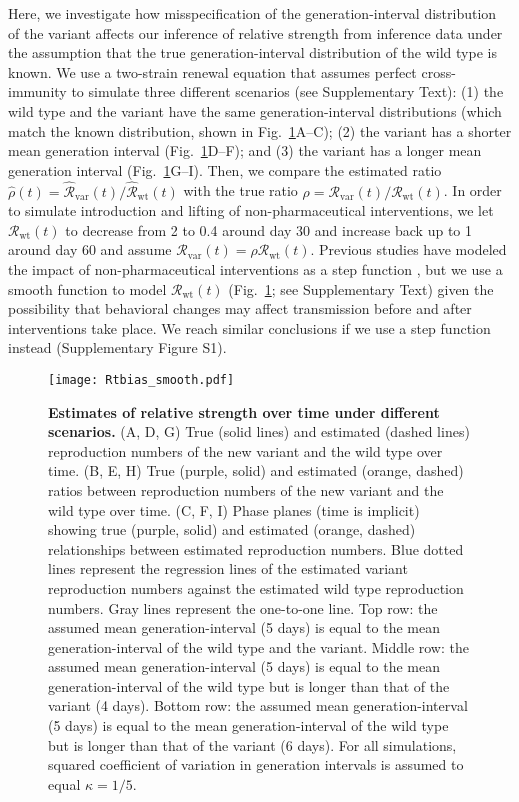 \documentclass[12pt]{article}
\newcommand{\fref}[1]{Fig.~\ref{fig:#1}}
\newcommand{\vvvar}{\mathrm{var}}
\newcommand{\wwwt}{\mathrm{wt}}
\newcommand{\Rx}[1]{\ensuremath{{\mathcal R}_{#1}}\xspace}
\newcommand{\RR}{\ensuremath{{\mathcal R}}\xspace}
\newcommand{\Rw}{\Rx{\wwwt}}
\newcommand{\Rv}{\Rx{\vvvar}}
\begin{document}
Here, we investigate how misspecification of the generation-interval distribution of the variant affects our inference of relative strength from inference data under the assumption that the true generation-interval distribution of the wild type is known.
We use a two-strain renewal equation that assumes perfect cross-immunity to simulate three different scenarios (see Supplementary Text):  
(1) the wild type and the variant have the same generation-interval distributions (which match the known distribution, shown in \fref{Rtbias}A--C);
(2) the variant has a shorter mean generation interval (\fref{Rtbias}D--F); and
(3) the variant has a longer mean generation interval (\fref{Rtbias}G--I).
Then, we compare the estimated ratio $\hat{\rho}(t) = \hat{\RR}_{\textrm{var}}(t)/\hat{\RR}_{\textrm{wt}}(t)$ with the true ratio $\rho = \Rv(t)/\Rw(t)$.
In order to simulate introduction and lifting of non-pharmaceutical interventions, we let $\Rw(t)$ to decrease from 2 to 0.4 around day 30 and increase back up to 1 around day 60 and assume $\Rv(t) = \rho \Rw(t)$.
Previous studies have modeled the impact of non-pharmaceutical interventions as a step function \citep{flaxman2020Rt}, but we use a smooth function to model $\Rw(t)$ (\fref{Rtbias}; see Supplementary Text) given the possibility that behavioral changes may affect transmission before and after interventions take place.
We reach similar conclusions if we use a step function instead (Supplementary Figure S1).

\begin{figure}[!pht]
\begin{center}
\texttt{[image: Rtbias\_smooth.pdf]}
\caption{
\textbf{Estimates of relative strength over time under different scenarios.}
(A, D, G) True (solid lines) and estimated (dashed lines) reproduction numbers of the new variant and the wild type over time.
(B, E, H) True (purple, solid) and estimated (orange, dashed) ratios between reproduction numbers of the new variant and the wild type over time.
(C, F, I) Phase planes (time is implicit) showing true (purple, solid) and estimated (orange, dashed) relationships between estimated reproduction numbers.
Blue dotted lines represent the regression lines of the estimated variant reproduction numbers against the estimated wild type reproduction numbers.
Gray lines represent the one-to-one line.
Top row: the assumed mean generation-interval (5 days) is equal to the mean generation-interval of the wild type and the variant.
Middle row: the assumed mean generation-interval (5 days) is equal to the mean generation-interval of the wild type but is longer than that of the variant (4 days).
Bottom row: the assumed mean generation-interval (5 days) is equal to the mean generation-interval of the wild type but is longer than that of the variant (6 days).
For all simulations, squared coefficient of variation in generation intervals is assumed to equal $\kappa = 1/5$.
}
\end{center}
\label{fig:Rtbias}
\end{figure}
\end{document}
